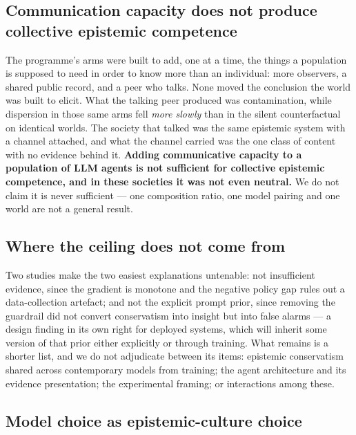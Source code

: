 \documentclass[pdflatex,sn-basic]{sn-jnl}
\begin{document}
\hypertarget{communication-capacity-does-not-produce-collective-epistemic-competence}{%
\subsection{Communication capacity does not produce collective epistemic competence}\label{communication-capacity-does-not-produce-collective-epistemic-competence}}

The programme's
arms were built to add, one at a time, the things a population is supposed to need in order to
know more than an individual: more observers, a shared public record, and a peer who talks. None
moved the conclusion the world was built to elicit. What the talking peer produced was
contamination, while dispersion in those same arms fell \emph{more slowly} than in the silent
counterfactual on identical worlds. The society that talked was the same epistemic system with a
channel attached, and what the channel carried was the one class of content with no evidence
behind it. \textbf{Adding communicative capacity to a population of LLM agents is not sufficient for
collective epistemic competence, and in these societies it was not even neutral.} We do not
claim it is never sufficient --- one composition ratio, one model pairing and one world are not a
general result.

\hypertarget{where-the-ceiling-does-not-come-from}{%
\subsection{Where the ceiling does not come from}\label{where-the-ceiling-does-not-come-from}}

Two studies make the two easiest explanations
untenable: not insufficient evidence, since the gradient is monotone and the negative
policy gap rules out a data-collection artefact; and not the explicit prompt prior, since
removing the guardrail did not convert conservatism into insight but into false alarms --- a
design finding in its own right for deployed systems, which will inherit some version of
that prior either explicitly or through training. What remains is a shorter list, and we
do not adjudicate between its items: epistemic conservatism shared across contemporary
models from training; the agent architecture and its evidence presentation; the
experimental framing; or interactions among these.

\hypertarget{model-choice-as-epistemic-culture-choice}{%
\subsection{Model choice as epistemic-culture choice}\label{model-choice-as-epistemic-culture-choice}}
\end{document}
